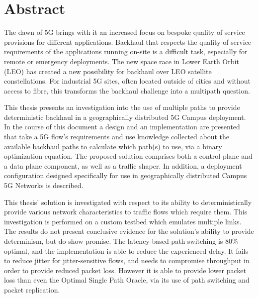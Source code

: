 
\cleardoublepage
{}
\section*{Abstract}

The dawn of 5G brings with it an increased focus on bespoke quality of service provisions for different applications. Backhaul that respects the quality of service requirements of the applications running on-site is a difficult task, especially for remote or emergency deployments. The new space race in Lower Earth Orbit (LEO) has created a new possibility for backhaul over LEO satellite constellations. For industrial 5G sites, often located outside of cities and without access to fibre, this transforms the backhaul challenge into a multipath question.

This thesis presents an investigation into the use of multiple paths to provide deterministic backhaul in a geographically distributed 5G Campus deployment. In the course of this document a design and an implementation are presented that take a 5G flow's requirements and use knowledge collected about the available backhaul paths to calculate which path(s) to use, via a binary optimization equation. The proposed solution comprises both a control plane and a data plane component, as well as a traffic shaper. In addition, a deployment configuration designed specifically for use in geographically distributed Campus 5G Networks is described.

This thesis' solution is investigated with respect to its ability to deterministically provide various network characteristics to traffic flows which require them. This investigation is performed on a custom testbed which emulates multiple links. The results do not present conclusive evidence for the solution's ability to provide determinism, but do show promise. The latency-based path switching is 80\% optimal, and the implementation is able to reduce the experienced delay. It fails to reduce jitter for jitter-sensitive flows, and needs to compromise throughput in order to provide reduced packet loss. However it is able to provide lower packet loss than even the Optimal Single Path Oracle, via its use of path switching and packet replication.


\cleardoublepage
{}
